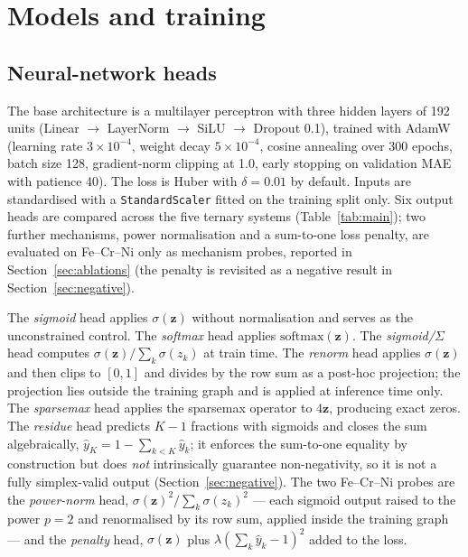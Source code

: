 \documentclass[preprint,12pt,authoryear]{elsarticle}
\begin{document}
\section{Models and training}
\label{sec:models}

\subsection{Neural-network heads}

The base architecture is a multilayer perceptron with three hidden layers of
192 units (Linear $\to$ LayerNorm $\to$ SiLU $\to$ Dropout 0.1), trained with
AdamW (learning rate $3\times10^{-4}$, weight decay $5\times10^{-4}$, cosine
annealing over 300 epochs, batch size 128, gradient-norm clipping at 1.0,
early stopping on validation MAE with patience 40). The loss is Huber with
$\delta = 0.01$ by default. Inputs are standardised with a
\texttt{StandardScaler} fitted on the training split only. Six output heads
are compared across the five ternary systems (Table~\ref{tab:main}); two further
mechanisms, power normalisation and a sum-to-one loss penalty, are
evaluated on Fe--Cr--Ni only as mechanism probes, reported in
Section~\ref{sec:ablations} (the penalty is revisited as a negative result
in Section~\ref{sec:negative}).

The \emph{sigmoid} head applies $\sigma(\mathbf{z})$ without normalisation
and serves as the unconstrained control. The \emph{softmax} head applies
$\mathrm{softmax}(\mathbf{z})$. The \emph{sigmoid/$\Sigma$} head computes
$\sigma(\mathbf{z}) / \sum_k \sigma(z_k)$ at train time. The \emph{renorm}
head applies $\sigma(\mathbf{z})$ and then clips to $[0,1]$ and divides by
the row sum as a post-hoc projection; the projection lies outside the
training graph and is applied at inference time only. The \emph{sparsemax} head applies the
sparsemax operator \citep{martins2016sparsemax} to $4\mathbf{z}$, producing
exact zeros. The \emph{residue} head predicts $K{-}1$ fractions with
sigmoids and closes the sum algebraically, $\hat y_K = 1 - \sum_{k<K}
\hat y_k$; it enforces the sum-to-one equality by construction but does
\emph{not} intrinsically guarantee non-negativity, so it is not a fully
simplex-valid output (Section~\ref{sec:negative}). The two Fe--Cr--Ni
probes are the \emph{power-norm} head, $\sigma(\mathbf{z})^2 / \sum_k
\sigma(z_k)^2$ --- each sigmoid output raised to the power $p = 2$ and
renormalised by its row sum, applied inside the training graph --- and the
\emph{penalty} head, $\sigma(\mathbf{z})$ plus
$\lambda(\sum_k \hat y_k - 1)^2$ added to the loss.
\end{document}
